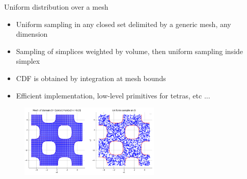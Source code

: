 \documentclass[aspectratio=169]{beamer}
\begin{document}
\begin{frame}{Uniform distribution over a mesh}
\begin{itemize}
\item Uniform sampling in any closed set delimited by a generic mesh, any dimension
\item Sampling of simplices weighted by volume, then uniform sampling inside simplex
\item CDF is obtained by integration at mesh bounds
\item Efficient implementation, low-level primitives for tetras, etc ...
\end{itemize}
\begin{figure}
   \includegraphics[width=0.6\textwidth]{figures/UniformOverMesh}
\end{figure}
\end{frame}
\end{document}
